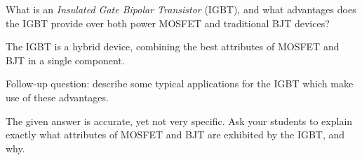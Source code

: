 

What is an {\it Insulated Gate Bipolar Transistor} (IGBT), and what advantages does the IGBT provide over both power MOSFET and traditional BJT devices?







The IGBT is a hybrid device, combining the best attributes of MOSFET and BJT in a single component.

\vskip 10pt

Follow-up question: describe some typical applications for the IGBT which make use of these advantages.







The given answer is accurate, yet not very specific.  Ask your students to explain exactly what attributes of MOSFET and BJT are exhibited by the IGBT, and why.




